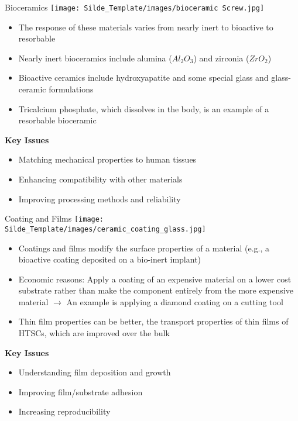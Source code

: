 \documentclass{libs/XJTLU_format}
\begin{document}
\begin{frame}{Bioceramics}
    \centering
    \texttt{[image: Silde\_Template/images/bioceramic Screw.jpg]}

\begin{itemize}
    \item The response of these materials varies from nearly inert to bioactive to resorbable \pause
    \item Nearly inert bioceramics include alumina ($Al_2O_3$) and zirconia ($ZrO_2$) \pause
    \item Bioactive ceramics include hydroxyapatite and some special glass and glass-ceramic formulations \pause
    \item Tricalcium phosphate, which dissolves in the body, is an example of a resorbable bioceramic \pause
\end{itemize}

\textbf{Key Issues}
\begin{itemize}
    \item Matching mechanical properties to human tissues
    \item Enhancing compatibility with other materials
    \item Improving processing methods and reliability 
\end{itemize}
    
\end{frame}

\begin{frame}{Coating and Films}
    \centering
    \texttt{[image: Silde\_Template/images/ceramic\_coating\_glass.jpg]}
    \begin{itemize}
        \item Coatings and films modify the surface properties of a material (e.g., a bioactive coating deposited on a bio-inert implant) \pause
        \item Economic reasons: Apply a coating of an expensive material on a lower cost substrate rather than make the component entirely from the more expensive material \pause $\rightarrow$ An example is applying a diamond coating on a cutting tool \pause
        \item Thin film properties can be better, the transport properties of thin films of HTSCs, which are improved over the bulk
    \end{itemize}


\textbf{Key Issues}
\begin{itemize}
    \item Understanding film deposition and growth
    \item Improving film/substrate adhesion
    \item Increasing reproducibility
\end{itemize}

\end{frame}
\end{document}
